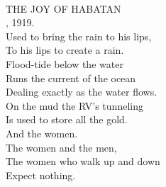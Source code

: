 \documentclass[smalldemyvopaper,11pt,twoside,onecolumn,openright,extrafontsizes]{memoir}
\begin{document}
\\THE JOY OF HABATAN
\\, 1919.
\\Used to bring the rain to his lips,
\\To his lips to create a rain.
\\Flood-tide below the water
\\Runs the current of the ocean
\\Dealing exactly as the water flows.
\\On the mud the RV's tunneling
\\Is used to store all the gold.
\\And the women.
\\The women and the men,
\\The women who walk up and down
\\Expect nothing.
\end{document}
